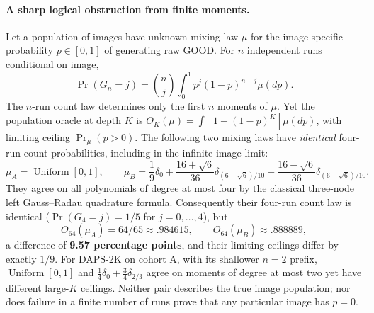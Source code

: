 \paragraph{A sharp logical obstruction from finite moments.}
Let a population of images have unknown mixing law $\mu$ for the
image-specific probability $p\in[0,1]$ of generating raw GOOD.
For $n$ independent runs conditional on image,
\begin{equation}\label{eq:suppl-four-moments}
 \Pr(G_n=j)=\binom nj\int_0^1p^j(1-p)^{n-j}\mu(dp).
\end{equation}
The $n$-run count law determines only the first $n$ moments of
$\mu$. Yet the population oracle at depth $K$ is
$O_K(\mu)=\int[1-(1-p)^K]\mu(dp)$, with limiting ceiling
$\Pr_\mu(p>0)$. The following two mixing laws have \emph{identical}
four-run count probabilities, including in the infinite-image
limit:
\begin{equation}\label{eq:suppl-radau-witness}
 \mu_A=\operatorname{Uniform}[0,1],\qquad
 \mu_B=\frac19\delta_0+
 \frac{16+\sqrt6}{36}\delta_{(6-\sqrt6)/10}
 +\frac{16-\sqrt6}{36}\delta_{(6+\sqrt6)/10}.
\end{equation}
They agree on all polynomials of degree at most four by the
classical three-node left Gauss--Radau quadrature formula.
Consequently their four-run count law is identical
($\Pr(G_4=j)=1/5$ for $j=0,\dots,4$), but
\[
 O_{64}(\mu_A)=64/65\approx .984615,\qquad
 O_{64}(\mu_B)\approx .888889,
\]
a difference of \textbf{9.57 percentage points}, and their limiting
ceilings differ by exactly $1/9$. For DAPS-2K on cohort A, with its shallower
$n=2$ prefix, $\operatorname{Uniform}[0,1]$ and
$\tfrac14\delta_0+\tfrac34\delta_{2/3}$ agree on moments of
degree at most two yet have different large-$K$ ceilings.
Neither pair describes the true image population; nor does
failure in a finite number of runs prove that any particular
image has $p=0$.

